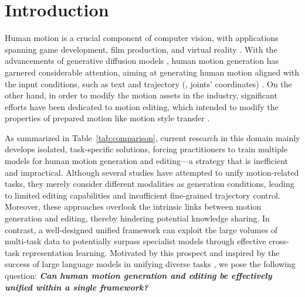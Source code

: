 \section{Introduction}


Human motion is a crucial component of computer vision, with applications spanning game development, film production, and virtual reality \cite{Guo_2022_CVPR,tevet2023human}. 
With the advancements of generative diffusion models \cite{ho2020denoising,song2020denoising,dhariwal2021diffusion}, human motion generation has garnered considerable attention, aiming at generating human motion aligned with the input conditions, such as text \cite{tevet2023human,zhang2022motiondiffuse,tevet2022motionclip} and trajectory (\ie, joints' coordinates) \cite{xie2023omnicontrol,fujiwara2025chronologically,sun2024lgtm,dai2025motionlcm,athanasiou2023sinc,athanasiou2022teach,zhang2023finemogen,song2023loss,sampieri2024length}. On the other hand, in order to modify the motion assets in the industry, significant efforts have been dedicated to motion editing, which intended to modify the properties of prepared motion like motion style transfer \cite{zhong2025smoodi,Song_2024_CVPR,aberman2020unpaired, guo2024generative, jang2022motion}. 

As summarized in Table~\ref{tab:comparison}, current research in this domain mainly develops isolated, task-specific solutions, forcing practitioners to train multiple models for human motion generation and editing—a strategy that is inefficient and impractical. Although several studies \cite{shrestha2025generating,zhou2023ude,zhou2023unified,zhang2025large,yang2024unimumo,luo2024m,fan2024everything2motion} have attempted to unify motion-related tasks, they merely consider different modalities as generation conditions, leading to limited editing capabilities and insufficient fine-grained trajectory control. Moreover, these approaches overlook the intrinsic links between motion generation and editing, thereby hindering potential knowledge sharing. In contrast, a well-designed unified framework can exploit the large volumes of multi-task data to potentially surpass specialist models through effective cross-task representation learning. Motivated by this prospect and inspired by the success of large language models in unifying diverse tasks \cite{achiam2023gpt,dubey2024llama}, we pose the following question: \textit{\textbf{Can human motion generation and editing be effectively unified within a single framework?}}

